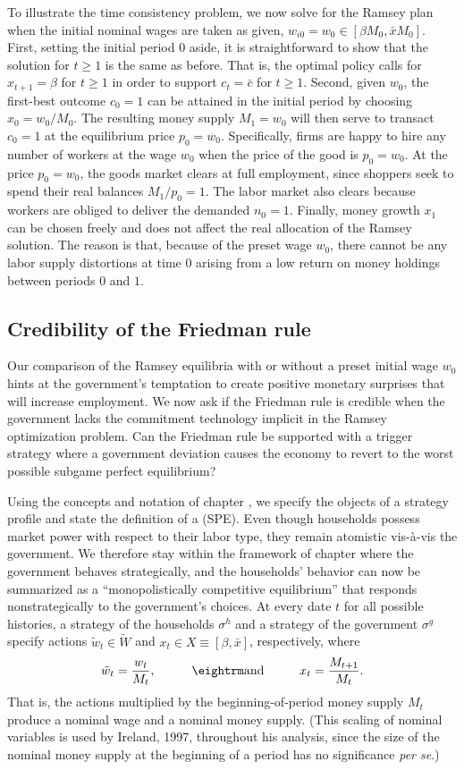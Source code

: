 To illustrate the time consistency problem, we now solve for the Ramsey plan
when the initial nominal wages are taken as given,
$w_{i0}=w_0 \in [\beta M_0, \bar x M_0]$.
First, setting the initial period $0$ aside,
it is straightforward to show that the solution for $t\geq 1$ is
the same as before. That is, the optimal policy calls for $x_{t+1}=\beta$ for
$t\geq 1$ in order to support $c_t=\bar c$ for $t\geq 1$. Second, given $w_0$,
the first-best outcome $c_0=1$ can be attained in the initial period by
choosing $x_0=w_0/M_0$. The resulting money supply $M_1=w_0$ will then serve to
transact $c_0=1$ at the equilibrium price $p_0=w_0$. Specifically,
firms are happy to hire any number of workers at the wage $w_0$ when
the price of the good is $p_0=w_0$. At the price $p_0=w_0$, the goods
market clears at full employment,
since shoppers seek to spend their real balances $M_1/p_0=1$. The labor
market also clears because workers are obliged to deliver the demanded
$n_0=1$. Finally, money growth $x_1$ can be chosen freely and
does not affect the real allocation of the Ramsey solution. The reason is
that, because of the preset wage $w_0$, there cannot be any labor
supply distortions at time $0$ arising from a low return
on money holdings between periods $0$ and $1$.
\subsection{Credibility of the Friedman rule}
Our comparison of the Ramsey equilibria with or without a preset
initial wage $w_0$ hints at the government's temptation to create
positive monetary surprises that will increase employment. We now
ask if the Friedman rule is credible when the government lacks the
commitment technology implicit in the Ramsey optimization problem.
Can the Friedman rule be supported with a trigger strategy where a
government deviation causes the economy to revert to the worst
possible subgame perfect equilibrium?


Using the concepts and notation of chapter ,
we specify the objects of a strategy
profile and state the definition of a  (SPE).
Even though households possess market power with respect to their
labor type, they remain atomistic vis-\`a-vis the government. We
therefore stay within the framework of chapter 
 where the government
behaves strategically, and the households' behavior can now be summarized as
a ``monopolistically competitive equilibrium'' that responds nonstrategically
to the government's choices. At every date $t$ for all possible histories,
a strategy of the households $\sigma^h$ and a strategy of the government
$\sigma^g$ specify actions $\tilde w_t\in \tilde W$ and
$x_t \in X \equiv [\beta, \bar x]$, respectively, where
$$
\tilde w_t = {w_t \over M_t},  \hskip1cm \hbox{\rm and} \hskip1cm
x_t        = {M_{t+1} \over M_t}.
$$
That is, the actions multiplied by the beginning-of-period money supply $M_t$
produce a nominal wage and a nominal money supply. (This scaling of nominal
variables is used by Ireland, 1997, throughout his analysis, since the
size of the nominal money supply at the beginning of a period has no
significance
{\it per se}.)

